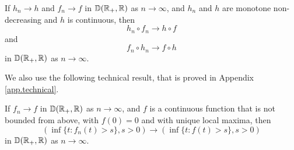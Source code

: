 \begin{lemma}\label{lemma.technicalcomposedfunctions}
If $h_n\to h$ and $f_n\to f$ in ${\mathbb D}({\mathbb R}_+,{\mathbb R})$ as $n\to\infty$, and $h_n$ and $h$ are monotone non-decreasing and $h$ is continuous, then 
$$h_n\circ f_n \to h\circ f$$
and 
$$f_n\circ h_n \to f\circ h$$
in ${\mathbb D}({\mathbb R}_+,{\mathbb R})$ as $n\to\infty$.
\end{lemma}

We also use the following technical result, that is proved in Appendix \ref{app.technical}.

\begin{lemma}\label{lem.technicalhittingtimes}
If $f_n\to f$ in ${\mathbb D}({\mathbb R}_+,{\mathbb R})$ as $n\to\infty$, and $f$ is a continuous function that is not bounded from above, with $f(0)=0$ and  with unique local maxima, then 
$$\left(\inf\{t:f_n(t)>s\},s>0\right)\to \left(\inf\{t:f(t)>s\},s>0\right)$$
in ${\mathbb D}({\mathbb R}_+,{\mathbb R})$ as $n\to\infty$.
\end{lemma}


